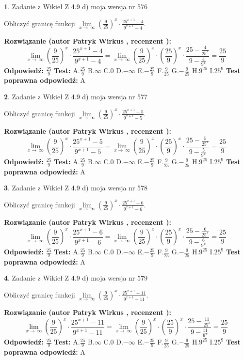 \documentclass[12pt, a4paper]{article}
\theoremstyle{definition} %
\newtheorem{zad}{}
\newcommand{\zadStart}[1]{\begin{zad}#1\newline}
\newcommand{\zadStop}{\end{zad}}
\newcommand{\rozwStart}[2]{\noindent \textbf{Rozwiązanie (autor #1 , recenzent #2): }\newline}
\newcommand{\rozwStop}{\newline}
\newcommand{\odpStart}{\noindent \textbf{Odpowiedź:}\newline}
\newcommand{\odpStop}{\newline}
\newcommand{\testStart}{\noindent \textbf{Test:}\newline}
\newcommand{\testStop}{\newline}
\newcommand{\kluczStart}{\noindent \textbf{Test poprawna odpowiedź:}\newline}
\newcommand{\kluczStop}{\newline}
\begin{document}
\zadStart{Zadanie z Wikieł Z 4.9 d) moja wersja nr 576}


Obliczyć granicę funkcji  $\lim\limits_{x\to\ \infty}(\frac{9}{25})^{x}\cdot\frac{25^{x+1}-4}{9^{x+1}-4}$.
\zadStop
\rozwStart{Patryk Wirkus}{}
$$\lim\limits_{x\to\ \infty}(\frac{9}{25})^{x}\cdot\frac{25^{x+1}-4}{9^{x+1}-4}=\lim\limits_{x\to\ \infty}(\frac{9}{25})^{x}\cdot(\frac{25}{9})^{x} \cdot \frac{25-\frac{4}{25^{x}}}{9-\frac{4}{9^{x}}} = \frac{25}{9}$$
\rozwStop
\odpStart
$\frac{25}{9}$
\odpStop
\testStart
A.$\frac{25}{9}$ B.$\infty$ C.$0$ D.$-\infty$ E.$-\frac{25}{9}$
F.$\frac{9}{25}$ G.$-\frac{9}{25}$
H.$9^{25}$
I.$25^{9}$
\testStop
\kluczStart
A
\kluczStop



\zadStart{Zadanie z Wikieł Z 4.9 d) moja wersja nr 577}


Obliczyć granicę funkcji  $\lim\limits_{x\to\ \infty}(\frac{9}{25})^{x}\cdot\frac{25^{x+1}-5}{9^{x+1}-5}$.
\zadStop
\rozwStart{Patryk Wirkus}{}
$$\lim\limits_{x\to\ \infty}(\frac{9}{25})^{x}\cdot\frac{25^{x+1}-5}{9^{x+1}-5}=\lim\limits_{x\to\ \infty}(\frac{9}{25})^{x}\cdot(\frac{25}{9})^{x} \cdot \frac{25-\frac{5}{25^{x}}}{9-\frac{5}{9^{x}}} = \frac{25}{9}$$
\rozwStop
\odpStart
$\frac{25}{9}$
\odpStop
\testStart
A.$\frac{25}{9}$ B.$\infty$ C.$0$ D.$-\infty$ E.$-\frac{25}{9}$
F.$\frac{9}{25}$ G.$-\frac{9}{25}$
H.$9^{25}$
I.$25^{9}$
\testStop
\kluczStart
A
\kluczStop



\zadStart{Zadanie z Wikieł Z 4.9 d) moja wersja nr 578}


Obliczyć granicę funkcji  $\lim\limits_{x\to\ \infty}(\frac{9}{25})^{x}\cdot\frac{25^{x+1}-6}{9^{x+1}-6}$.
\zadStop
\rozwStart{Patryk Wirkus}{}
$$\lim\limits_{x\to\ \infty}(\frac{9}{25})^{x}\cdot\frac{25^{x+1}-6}{9^{x+1}-6}=\lim\limits_{x\to\ \infty}(\frac{9}{25})^{x}\cdot(\frac{25}{9})^{x} \cdot \frac{25-\frac{6}{25^{x}}}{9-\frac{6}{9^{x}}} = \frac{25}{9}$$
\rozwStop
\odpStart
$\frac{25}{9}$
\odpStop
\testStart
A.$\frac{25}{9}$ B.$\infty$ C.$0$ D.$-\infty$ E.$-\frac{25}{9}$
F.$\frac{9}{25}$ G.$-\frac{9}{25}$
H.$9^{25}$
I.$25^{9}$
\testStop
\kluczStart
A
\kluczStop



\zadStart{Zadanie z Wikieł Z 4.9 d) moja wersja nr 579}


Obliczyć granicę funkcji  $\lim\limits_{x\to\ \infty}(\frac{9}{25})^{x}\cdot\frac{25^{x+1}-11}{9^{x+1}-11}$.
\zadStop
\rozwStart{Patryk Wirkus}{}
$$\lim\limits_{x\to\ \infty}(\frac{9}{25})^{x}\cdot\frac{25^{x+1}-11}{9^{x+1}-11}=\lim\limits_{x\to\ \infty}(\frac{9}{25})^{x}\cdot(\frac{25}{9})^{x} \cdot \frac{25-\frac{11}{25^{x}}}{9-\frac{11}{9^{x}}} = \frac{25}{9}$$
\rozwStop
\odpStart
$\frac{25}{9}$
\odpStop
\testStart
A.$\frac{25}{9}$ B.$\infty$ C.$0$ D.$-\infty$ E.$-\frac{25}{9}$
F.$\frac{9}{25}$ G.$-\frac{9}{25}$
H.$9^{25}$
I.$25^{9}$
\testStop
\kluczStart
A
\kluczStop
\end{document}
